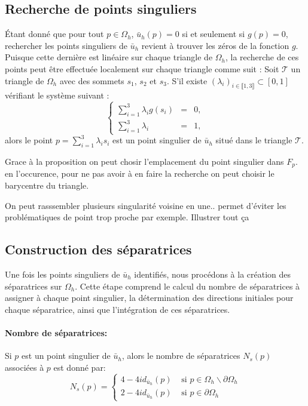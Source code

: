 \subsection{Recherche de points singuliers}

Étant donné que pour tout $p\in\Omega_h$, $\bar{u}_h(p)=0$ si et seulement si $g(p)=0$, rechercher les points singuliers de $\bar{u}_h$ revient à trouver les zéros de la fonction $g$. Puisque cette dernière est linéaire sur chaque triangle de $\Omega_h$, la recherche de ces points peut être effectuée localement sur chaque triangle comme suit : Soit $\mathcal{T}$ un triangle de $\Omega_h$ avec des sommets $s_1$, $s_2$ et $s_3$. S'il existe $(\lambda_i)_{i\in\llbracket 1, 3\rrbracket}\subset[0, 1]$ vérifiant le système suivant :
\begin{equation}
    \left\{
    \begin{array}{lcl}
    \displaystyle\sum_{i=1}^3\lambda_i g(s_i) & = & 0,\\[0.3cm]
    \displaystyle\sum_{i=1}^3\lambda_i & = & 1,
    \end{array}
    \right.
\end{equation}
alors le point $p=\sum_{i=1}^3\lambda_i s_i$ est un point singulier de $\bar{u}_h$ situé dans le triangle $\mathcal{T}$.\\

\begin{remark}
    Grace à la proposition on peut chosir l'emplacement du point singulier dans $F_p$. en l'occurence, pour ne pas avoir à en faire la recherche on peut choisir le barycentre du triangle.\\
\end{remark}

On peut rasssembler plusieurs singularité voisine en une.. permet d'éviter les problématiques de point trop proche par exemple.
Illustrer tout ça 

\subsection{Construction des séparatrices}

Une fois les points singuliers de $\bar{u}_h$ identifiés, nous procédons à la création des séparatrices sur $\Omega_h$. Cette étape comprend le calcul du nombre de séparatrices à assigner à chaque point singulier, la détermination des directions initiales pour chaque séparatrice, ainsi que l'intégration de ces séparatrices.

\paragraph{Nombre de séparatrices:} Si $p$ est un point singulier de $\bar{u}_h$, alors le nombre de séparatrices $N_s(p)$ associées à $p$ est donné par:
\begin{equation}
    N_s(p) = 
    \left\{
    \begin{array}{ll}
    4-4id_{\bar{u}_h}(p) & \mbox{ si } p\in\Omega_h\backslash\partial\Omega_h\\[0.3cm]
    2-4id_{\bar{u}_h}(p) & \mbox{ si } p\in\partial\Omega_h
    \end{array}
    \right.
\end{equation}

